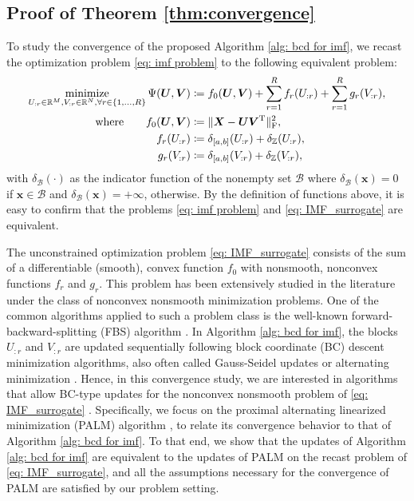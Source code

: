 \subsection{Proof of Theorem \ref{thm:convergence}} \label{app: convergence proof}

To study the convergence of the proposed Algorithm \ref{alg: bcd for imf}, we recast the optimization problem \eqref{eq: imf problem} to the following equivalent problem:
\begin{align}
    \begin{split}
        \operatorname*{minimize}_{U_{:r} \in \mathbb{R}^{M}, V_{:r} \in \mathbb{R}^{N}, \forall r\in\{1,...,R\}} \Psi(\bm U, \bm V) &\coloneqq f_0(\bm U, \bm V) + \sum_{r=1}^R f_r(U_{:r}) + \sum_{r=1}^R g_r(V_{:r}),\\
        \text{where} \quad~~~ f_0(\bm U, \bm V) &\coloneqq \|\bm X - \bm U \bm V^{\rm T} \|_{\rm F}^2,\\
        f_r(U_{:r}) &\coloneqq \delta_{[a,b]}(U_{:r}) + \delta_\mathbb Z(U_{:r}),\\
        g_r(V_{:r}) &\coloneqq \delta_{[a,b]}(V_{:r}) + \delta_\mathbb Z(V_{:r}),
    \end{split}
    \label{eq: IMF_surrogate}
\end{align}
with $\delta_\mathcal{B}(\cdot)$ as the indicator function of the nonempty set $\mathcal{B}$ where $\delta_\mathcal{B}(\bm x) = 0$ if $\bm x \in \mathcal{B}$ and $\delta_\mathcal{B}(\bm x) = +\infty$, otherwise. By the definition of functions above, it is easy to confirm that the problems \eqref{eq: imf problem} and \eqref{eq: IMF_surrogate} are equivalent.

The unconstrained optimization problem \eqref{eq: IMF_surrogate} consists of the sum of a differentiable (smooth), convex function $f_0$ with nonsmooth, nonconvex functions $f_r$ and $g_r$. This problem has been extensively studied in the literature under the class of nonconvex nonsmooth minimization problems.
One of the common algorithms applied to such a problem class is the well-known forward-backward-splitting (FBS) algorithm \cite{combettes2011proximal,bauschke2017correction}.
In Algorithm \ref{alg: bcd for imf}, the blocks $U_{:r}$ and $V_{:r}$ are updated sequentially following block coordinate (BC) descent minimization algorithms, also often called Gauss-Seidel updates or alternating minimization \cite{nesterov2012efficiency,attouch2013convergence}.
Hence, in this convergence study, we are interested in algorithms that allow BC-type updates for the nonconvex nonsmooth problem of \eqref{eq: IMF_surrogate} \cite{beck2013convergence,bolte2014proximal}. Specifically, we focus on the proximal alternating linearized minimization (PALM) algorithm \cite{bolte2014proximal}, to relate its convergence behavior to that of Algorithm \ref{alg: bcd for imf}.
To that end, we show that the updates of Algorithm \ref{alg: bcd for imf} are equivalent to the updates of PALM on the recast problem of \eqref{eq: IMF_surrogate}, and all the assumptions necessary for the convergence of PALM are satisfied by our problem setting.

